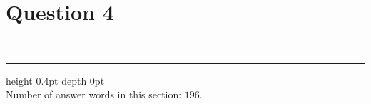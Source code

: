 \chapter*{Question 4}



$ $\\
\hrule height 0.4pt depth 0pt \relax
$ $\\
Number of answer words in this section: $196$.
